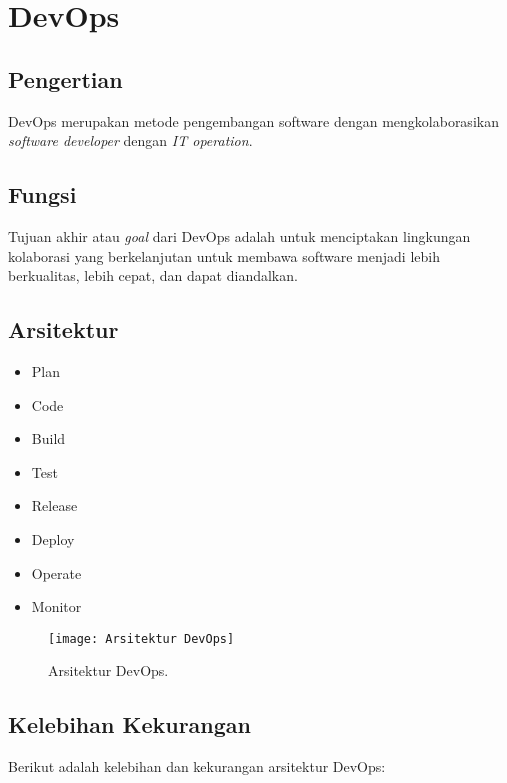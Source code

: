 \chapter{DevOps}

\section{Pengertian}
DevOps merupakan metode pengembangan software dengan mengkolaborasikan \textit{software developer} dengan \textit{IT operation}. 
\section{Fungsi}
Tujuan akhir atau \textit{goal} dari DevOps adalah untuk menciptakan lingkungan kolaborasi yang berkelanjutan untuk membawa software menjadi lebih berkualitas, lebih cepat, dan dapat diandalkan.
\section{Arsitektur}
	\begin{itemize}
	\item Plan
	\item Code
	\item Build
	\item Test
	\item Release
	\item Deploy
	\item Operate
	\item Monitor
\end{itemize}
\begin{figure}[h]
	\centering
	\texttt{[image: Arsitektur DevOps]}
	\caption{Arsitektur DevOps.}
	\label{fig:Arsitektur DevOps}
\end{figure}



\section{Kelebihan Kekurangan}
Berikut adalah kelebihan dan kekurangan arsitektur DevOps:

